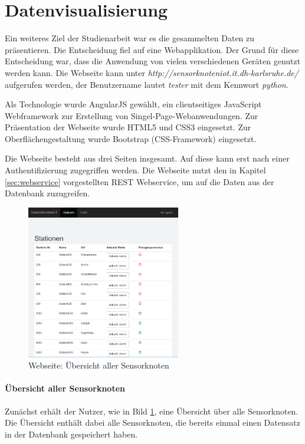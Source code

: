 \section{Datenvisualisierung}
\label{sec:Datenvisualiserung}
Ein weiteres Ziel der Studienarbeit war es die gesammelten Daten zu präsentieren. Die Entscheidung fiel auf eine Webapplikation. Der Grund für diese Entscheidung war, dass die Anwendung von vielen verschiedenen Geräten genutzt werden kann. Die Webseite kann unter \textit{ http://sensorknoteniot.it.dh-karlsruhe.de/} aufgerufen werden, der Benutzername lautet \textit{tester} mit dem Kennwort \textit{python}.

Als Technologie wurde AngularJS gewählt, ein clientseitiges JavaScript Webframework zur Erstellung von Singel-Page-Webanwendungen. Zur Präsentation der Webseite wurde HTML5 und CSS3 eingesetzt. Zur Oberflächengestaltung wurde Bootstrap (CSS-Framework) eingesetzt.

Die Webseite besteht aus drei Seiten insgesamt. Auf diese kann erst nach einer Authentifizierung zugegriffen werden. Die Webseite nutzt den in Kapitel \ref{sec:webservice} vorgestellten REST Webservice, um auf die Daten aus der Datenbank zuzugreifen.
\begin{figure}
	\centering
	\includegraphics[width=0.6\textwidth]{bilder/WebseiteUebersicht}
	\caption{Webseite: Übersicht aller Sensorknoten}
	\label{img:WebseiteUebersicht}
\end{figure}

\paragraph{Übersicht aller Sensorknoten} Zunächst erhält der Nutzer, wie in Bild \ref{img:WebseiteUebersicht}, eine Übersicht über alle Sensorknoten. Die Übersicht enthält dabei alle Sensorknoten, die bereits einmal einen Datensatz in der Datenbank gespeichert haben.


